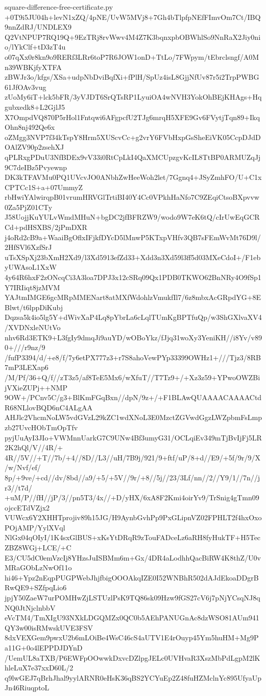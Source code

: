 \documentclass[11pt]{article}
\theoremstyle{definition}
\theoremstyle{remark}
\begin{document}
\begin{filecontents*}[overwrite]{square-difference-free-certificate.py}
+0T9i5JU04h+levN1xZQ/4pNE/UvW5MVj8+7Gh4bTlpfpNEfFImvOm7Ct/IBQ9nnZdRJ/UNDLEX9
Q2VtNPUP7RQ19Q+9EzTRj8rvWwv4M4Z7K3bqnxpbOBWhlSo9NnRaX2Jiy0nio/lYkClf+tD3zT4u
o07qXx0r8kn9o9RERf3LRr6toP7R6JOW1onD+TtLo/7FWpym/tEbrclsngf/A0Mn39WBKjfyXTFA
zBWJr3o/kfgs/XSa+udpNbDviBqfXi+fPlH/SpUz4isL8GjjNfUv87r5i2TrpPWBG61JfOAv3vug
zUoMy6iT+lck5bFR/3yVJDT6SrQTsRP1LyuiOA4wNVH3YokOhBEjKHAgs+Hqgubxedk8+L2GjlJ5
X7OmpdVQ870P5rHol1Fntqwi6AFgpcfU2TJg6mrqH5XFE9Gv6FVytjTqn89+IkqOhn8nj492Qe6x
oZMgg3NVP7f34kTspY8Hrm5XUScvCc+g2vrY6FVbHxpGsSheEiVK05CcpDJdDOAlZV90p2zsehXJ
qPLRxgPDuU3NfBDEx9vV33i0RtCpLkI4QaXMCUpzgvKcIL8TtBP0ARMUZqJj9C7deIBz5Pvyewnp
DK3kTFAVMu0PQ1UVcvJO0ANbhZwHeeWoh2let/7Ggnq4+JSyZmhFO/U+C1xCPTCc1S+a+07UmmyZ
rbHwiYAlwirqpB01vrumHRVGlTrtiBI40Y4Cc0VPkhHaNfo7C9ZEqiCtsoBXpvvw0Za5PjZ01CTy
J58UojjKuYULvWmdMHuN+bgDC2jfBFRZW9/wodo9W7eK6tQ/cIrUwEqGCRCd+pdHSXBS/2jPmDXR
j4oRd2cB9a+WaaiBgOflxIFjkfDYcD5lMnwP5KTxpVHfv3QB7sFEmWvMt76D9l/2HfSVl6XzfSrJ
uTsXSpXj23bXmH2Xd9/l3Xd5913efZd33+Xdd3n3Xd59l3ff5d03MXeCdoI+/F1ebyUWAsoL1XxW
4y64R6hxF2zONcqCi3A3loa7DPJ3x12cSRq09Qx1PDB0TKWO62BnNRy4O9fSp1Y7IRIiqt8jzMVM
YAJtmIMGE6gcMRpMMENart8atMXfWdohlzVmukfIl7/6z8mbxAcGRpdYG+8EBlwt/t6lppDiKubj
Dqzsa5k4io5lg5Y+dWivXaP4Lq8pYbrLa6cLqlTUmKgBPTfuQp/w3ShGXlvaXV4/XVDNxleNUtVo
nhv6Rd3ETK9+L3fgIy9dmqJi9auYD/wOBoYkz/fJjq31woXy3YeniKH//i8Yv/v890+///r9nz/9
/fufP3394/d/+e8/f/7y6etPX777z3+r7S8ahoVewPYp33399OWHz1+///Tjz3/8RB7mP3LEXap6
/M/Pf/36+Q/f//zT3z5/af8TeE5Mx6/wXfuT//T7Tz9+/+Xz3z59+YPwoOWZBijVXieZUPj++NMP
9OW+/PCnv5C/g3+BlKmFGqBxn//dpN/9z+/+F1BLAwQUAAAACAAAACtdR68NLlovBQD6nC4ALgAA
AHJlc2VhcmNoLW5vdGVzL29kZC1wdXNoL3E0MzctZGVwdGgzLWZpbmFsLmpzb27UvcHObTmOpTfv
pyjUuAyI3JIo+VWMnnUarkG7C9UNw4Bf3umyG31/OCLqiEv349mTjBvIjFj5LR2K2hQl/V//4R/+
4R//5V//+T//7b/+4//8D//L3//uH/7B9j/921/9+ftf/uP/8+d//E9/+5f/9r/9/X/w/Nvf/ef/
8p/+9ve/+cd//dv/8bd//a9/+5/+5V//9r/+8//5j//23/3Lf/nn//2//Y9/1//7n//jr3//t7d/
+uM/P//fH//jP/3//pn5T3/4x//+D/yHX/6xA8F2Kmi4oirYv9/TrSnig4gTmn09ojccETdVZjx2
VUWcx6Y2XHHTprojiv89h15JG/H9AynbGvhPp9PxGLipnVZ02FPHLT2f4hxOxoPOjAMP/YylXVql
NlGx04qOIyI/1K4sxGlBUS+xKsYtDRqR9zTouFADceLz6aRH8fyHukTF+H5TecZBZ8WGj+LCE/+C
E3/CU5dC0emVzcIj8YHzsJuISBMm6m+Gx/4DR4aLodhhQacBiRW4K8thZ/U0vMRaGObLzNwOf11o
hi46+Ypz2nEqpPUGPWebJhjfbigOOOAkqIZE0I52WNBhR502dAJdEkoaDDgrBRwQE9+SZfpqLio6
jpjY50ZaeW7urPOMHwZjLSTUzlPsK9TQ86sk09Hzw9fGS27cV6j7pNjYCsqNJ8qNQ0JtNjclnbbV
eVcTM4/TmXIgU93NXkLDGQMZx0QC0b5AEhPANUGnAc8dzWSO81AUm941QY3w00isRMwskUVE3FSV
8dxVEXGem9pwxU2b6mLOiBe4WsC46cS4aUTV1E4rOuyp45Ym5huHM+Mg9Pa11G+0o4lEPPDJDYnD
/UemUL8aTXB/P6EWFpOOwwkDxvcDZlpgJELc0UVHvaR3XszMbPdLgpM2lKhleLuX7e37xxD60L/2
q9lwGEJ7qBrhJhal9yylARNR0eHsK36qBS2YCYuEp2Z48fuHZMclnYc895UfyaUpJn46RiuqptoL

\end{filecontents*}
\end{document}
